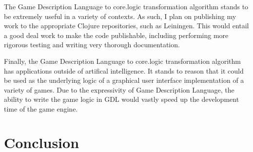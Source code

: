 \documentclass[letterpaper]{article}
\begin{document}
The Game Description Language to core.logic transformation algorithm stands to be extremely useful in a variety of contexts. As such, I plan on publishing my work to the appropriate Clojure repositories, such as Leiningen. This would entail a good deal work to make the code publishable, including performing more rigorous testing and writing very thorough documentation.

Finally, the Game Description Language to core.logic transformation algorithm has applications outside of artifical intelligence. It stands to reason that it could be used as the underlying logic of a graphical user interface implementation of a variety of games. Due to the expressivity of Game Description Language, the ability to write the game logic in GDL would vastly speed up the development time of the game engine.

\section{Conclusion}



\end{document}
